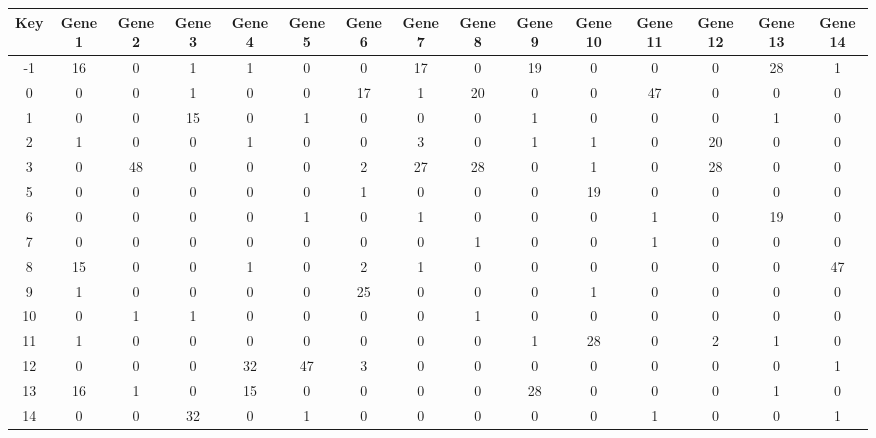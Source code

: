 \begin{tabular}{|c|c|c|c|c|c|c|c|c|c|c|c|c|c|c|}
\hline
Key & Gene 1 & Gene 2 & Gene 3 & Gene 4 & Gene 5 & Gene 6 & Gene 7 & Gene 8 & Gene 9 & Gene 10 & Gene 11 & Gene 12 & Gene 13 & Gene 14 \\
\hline
-1 & 16 & 0 & 1 & 1 & 0 & 0 & 17 & 0 & 19 & 0 & 0 & 0 & 28 & 1 \\
0 & 0 & 0 & 1 & 0 & 0 & 17 & 1 & 20 & 0 & 0 & 47 & 0 & 0 & 0 \\
1 & 0 & 0 & 15 & 0 & 1 & 0 & 0 & 0 & 1 & 0 & 0 & 0 & 1 & 0 \\
2 & 1 & 0 & 0 & 1 & 0 & 0 & 3 & 0 & 1 & 1 & 0 & 20 & 0 & 0 \\
3 & 0 & 48 & 0 & 0 & 0 & 2 & 27 & 28 & 0 & 1 & 0 & 28 & 0 & 0 \\
5 & 0 & 0 & 0 & 0 & 0 & 1 & 0 & 0 & 0 & 19 & 0 & 0 & 0 & 0 \\
6 & 0 & 0 & 0 & 0 & 1 & 0 & 1 & 0 & 0 & 0 & 1 & 0 & 19 & 0 \\
7 & 0 & 0 & 0 & 0 & 0 & 0 & 0 & 1 & 0 & 0 & 1 & 0 & 0 & 0 \\
8 & 15 & 0 & 0 & 1 & 0 & 2 & 1 & 0 & 0 & 0 & 0 & 0 & 0 & 47 \\
9 & 1 & 0 & 0 & 0 & 0 & 25 & 0 & 0 & 0 & 1 & 0 & 0 & 0 & 0 \\
10 & 0 & 1 & 1 & 0 & 0 & 0 & 0 & 1 & 0 & 0 & 0 & 0 & 0 & 0 \\
11 & 1 & 0 & 0 & 0 & 0 & 0 & 0 & 0 & 1 & 28 & 0 & 2 & 1 & 0 \\
12 & 0 & 0 & 0 & 32 & 47 & 3 & 0 & 0 & 0 & 0 & 0 & 0 & 0 & 1 \\
13 & 16 & 1 & 0 & 15 & 0 & 0 & 0 & 0 & 28 & 0 & 0 & 0 & 1 & 0 \\
14 & 0 & 0 & 32 & 0 & 1 & 0 & 0 & 0 & 0 & 0 & 1 & 0 & 0 & 1 \\
\hline
\end{tabular}